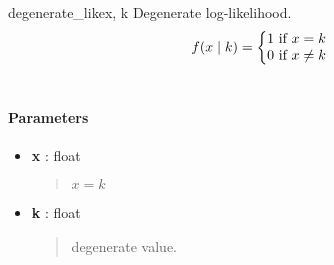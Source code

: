 \hypertarget{pymc.distributions.degenerate_like}{}\begin{funcdesc}{degenerate\_like}{x, k}
Degenerate log-likelihood.
\begin{gather}
\begin{split}f(x \mid k) = \left\{ \begin{matrix} 1 \text{ if } x = k \\ 0 \text{ if } x \ne k\end{matrix} \right.\end{split}\notag\\\begin{split}\end{split}\notag
\end{gather}
\paragraph{Parameters}
\begin{itemize}
\item[] \textbf{x} : float
\begin{quote}

$x = k$
\end{quote}

\item[] \textbf{k} : float
\begin{quote}

degenerate value.
\end{quote}
\end{itemize}
\end{funcdesc}

